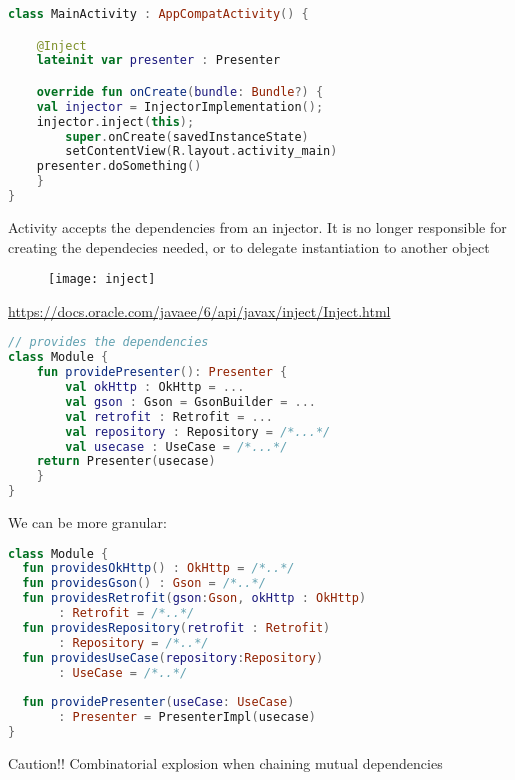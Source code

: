 \documentclass[10pt]{beamer}
\begin{document}
\begin{frame}[fragile]
\begin{lstlisting}[language=Kotlin, basicstyle=\ttfamily]
class MainActivity : AppCompatActivity() {

    @Inject
    lateinit var presenter : Presenter

    override fun onCreate(bundle: Bundle?) {
	val injector = InjectorImplementation();
	injector.inject(this);  
        super.onCreate(savedInstanceState)
        setContentView(R.layout.activity_main)
	presenter.doSomething()
    }
}
\end{lstlisting} 
	 Activity accepts the dependencies from an injector. 
	 It is no longer responsible for creating the dependecies needed,
	 or to delegate instantiation to another object
\end{frame}
\begin{frame}[fragile]
	\begin{figure}
		\centering
		\texttt{[image: inject]}
	\end{figure}
	\url{https://docs.oracle.com/javaee/6/api/javax/inject/Inject.html}
\end{frame}
\begin{frame}[fragile]
\begin{lstlisting}[language=Kotlin, basicstyle=\ttfamily]
// provides the dependencies 
class Module {
    fun providePresenter(): Presenter {
        val okHttp : OkHttp = ...
        val gson : Gson = GsonBuilder = ...
        val retrofit : Retrofit = ...
        val repository : Repository = /*...*/
        val usecase : UseCase = /*...*/
	return Presenter(usecase) 
    }
}
\end{lstlisting} 
\end{frame}
\begin{frame}[fragile]
	We can be more granular:
\begin{lstlisting}[language=Kotlin, basicstyle=\ttfamily]
class Module {
  fun providesOkHttp() : OkHttp = /*..*/
  fun providesGson() : Gson = /*..*/
  fun providesRetrofit(gson:Gson, okHttp : OkHttp) 
       : Retrofit = /*..*/
  fun providesRepository(retrofit : Retrofit) 
       : Repository = /*..*/
  fun providesUseCase(repository:Repository) 
       : UseCase = /*..*/
    
  fun providePresenter(useCase: UseCase) 
       : Presenter = PresenterImpl(usecase) 
}
\end{lstlisting} 
\end{frame}

\begin{frame}[fragile]
	\begin{alertblock}{Caution!!}
		Combinatorial explosion when chaining mutual dependencies
	\end{alertblock}
\end{frame}
\end{document}
